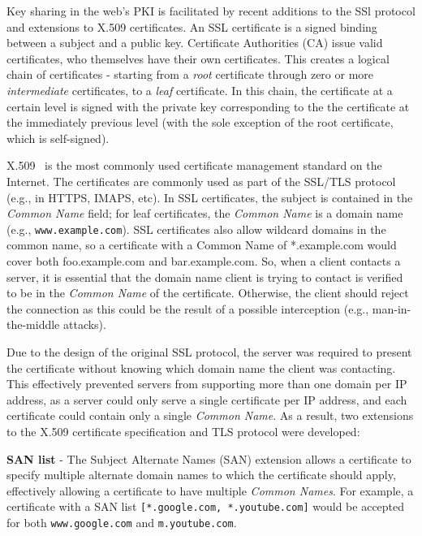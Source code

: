 \documentclass{acm_proc_article-sp}
\begin{document}
Key sharing in the web's PKI is facilitated by recent additions to the SSl protocol and extensions to X.509 certificates. An SSL certificate is a signed binding between a subject and a public key. Certificate Authorities (CA) issue valid certificates, who themselves have their own certificates. This creates a logical chain of certificates - starting from a \textit{root} certificate through zero or more \textit{intermediate} certificates, to a \textit{leaf} certificate. In this chain, the certificate at a certain level is signed with the private key corresponding to the the certificate at the immediately previous level (with the sole exception of the root certificate, which is self-signed).

X.509~\cite{housley2002internet} is the most commonly used certificate management standard on the Internet. The certificates are commonly used as part of the SSL/TLS protocol (e.g., in HTTPS, IMAPS, etc). In SSL certificates, the subject is contained in the \textit{Common Name} field; for leaf certificates, the \textit{Common Name} is a domain name (e.g., \texttt{www.example.com}). SSL certificates also allow wildcard domains in the common name, so a certificate with a Common Name of *.example.com would cover both foo.example.com and bar.example.com. So, when a client contacts a server, it is essential that the domain name client is trying to contact is verified to be in the \textit{Common Name} of the certificate. Otherwise, the client should reject the connection as this could be the result of a possible interception (e.g., man-in-the-middle attacks).

Due to the design of the original SSL protocol, the server was required to present the certificate without knowing which domain name the client was contacting. This effectively prevented servers from supporting more than one domain per IP address, as a server could only serve a single certificate per IP address, and each certificate could contain only a single \textit{Common Name}. As a result, two extensions to the X.509 certificate specification and TLS protocol were developed:

\textbf{SAN list} - The Subject Alternate Names (SAN) extension allows a certificate to specify multiple alternate domain names to which the certificate should apply, effectively allowing a certificate to have multiple \textit{Common Names}. For example, a certificate with a SAN list \texttt{[*.google.com, *.youtube.com]} would be accepted for both \texttt{www.google.com} and \texttt{m.youtube.com}.
\end{document}

